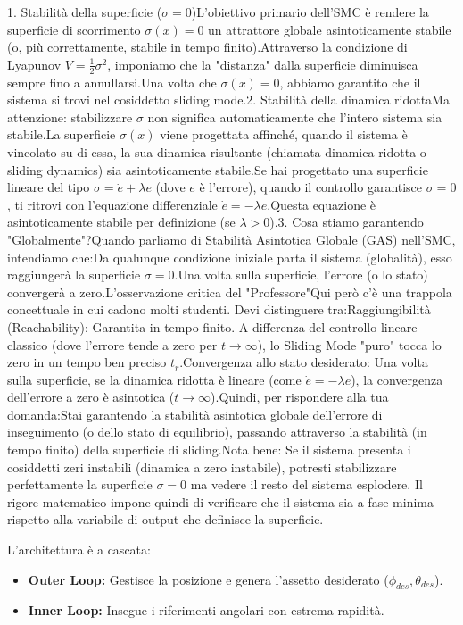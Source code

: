 \documentclass[12pt,a4paper]{article}
\begin{document}
1. Stabilità della superficie ($\sigma = 0$)L'obiettivo primario dell'SMC è rendere la superficie di scorrimento $\sigma(x) = 0$ un attrattore globale asintoticamente stabile (o, più correttamente, stabile in tempo finito).Attraverso la condizione di Lyapunov $V = \frac{1}{2}\sigma^2$, imponiamo che la "distanza" dalla superficie diminuisca sempre fino a annullarsi.Una volta che $\sigma(x) = 0$, abbiamo garantito che il sistema si trovi nel cosiddetto sliding mode.2. Stabilità della dinamica ridottaMa attenzione: stabilizzare $\sigma$ non significa automaticamente che l'intero sistema sia stabile.La superficie $\sigma(x)$ viene progettata affinché, quando il sistema è vincolato su di essa, la sua dinamica risultante (chiamata dinamica ridotta o sliding dynamics) sia asintoticamente stabile.Se hai progettato una superficie lineare del tipo $\sigma = \dot{e} + \lambda e$ (dove $e$ è l'errore), quando il controllo garantisce $\sigma = 0$, ti ritrovi con l'equazione differenziale $\dot{e} = -\lambda e$.Questa equazione è asintoticamente stabile per definizione (se $\lambda > 0$).3. Cosa stiamo garantendo "Globalmente"?Quando parliamo di Stabilità Asintotica Globale (GAS) nell'SMC, intendiamo che:Da qualunque condizione iniziale parta il sistema (globalità), esso raggiungerà la superficie $\sigma=0$.Una volta sulla superficie, l'errore (o lo stato) convergerà a zero.L'osservazione critica del "Professore"Qui però c'è una trappola concettuale in cui cadono molti studenti. Devi distinguere tra:Raggiungibilità (Reachability): Garantita in tempo finito. A differenza del controllo lineare classico (dove l'errore tende a zero per $t \to \infty$), lo Sliding Mode "puro" tocca lo zero in un tempo ben preciso $t_r$.Convergenza allo stato desiderato: Una volta sulla superficie, se la dinamica ridotta è lineare (come $\dot{e} = -\lambda e$), la convergenza dell'errore a zero è asintotica ($t \to \infty$).Quindi, per rispondere alla tua domanda:Stai garantendo la stabilità asintotica globale dell'errore di inseguimento (o dello stato di equilibrio), passando attraverso la stabilità (in tempo finito) della superficie di sliding.Nota bene: Se il sistema presenta i cosiddetti zeri instabili (dinamica a zero instabile), potresti stabilizzare perfettamente la superficie $\sigma=0$ ma vedere il resto del sistema esplodere. Il rigore matematico impone quindi di verificare che il sistema sia a fase minima rispetto alla variabile di output che definisce la superficie.

L'architettura è a cascata:
\begin{itemize}
    \item \textbf{Outer Loop:} Gestisce la posizione e genera l'assetto desiderato ($\phi_{des}, \theta_{des}$).
    \item \textbf{Inner Loop:} Insegue i riferimenti angolari con estrema rapidità.
\end{itemize}
\end{document}
